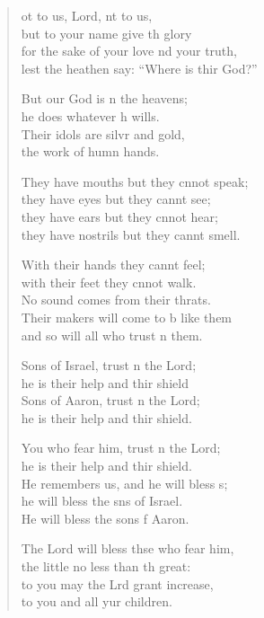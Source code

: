 \settowidth{\versewidth}{for the sake of your love and your truth, *}
\begin{verse}%
  \begin{patverse}
ot to us, Lord, nt to us,\Med\\
but to your name give th glory\\
for the sake of your love nd your truth,\Med\\
lest the heathen say: “Where is thir God?”

But our God is \pointup{\i}n the heavens;\Med\\
he does whatever h wills.\\
Their idols are silvr and gold,\Med\\
the work of humn hands.

They have mouths but they cnnot speak;\Med\\
they have eyes but they cannt see;\\
they have ears but they cnnot hear;\Med\\
they have nostrils but they cannt smell.

With their hands they cannt feel;\Flex\\
with their feet they cnnot walk.\Med\\
No sound comes from their thrats.\\
Their makers will come to b like them\Med\\
and so will all who trust \pointup{\i}n them.

Sons of Israel, trust \pointup{\i}n the Lord;\Med\\
he is their help and thir shield\\
Sons of Aaron, trust \pointup{\i}n the Lord;\Med\\
he is their help and thir shield.

You who fear him, trust \pointup{\i}n the Lord;\Med\\
he is their help and thir shield.\\
He remembers us, and he will bless s;\Flex\\
he will bless the sns of Israel.\Med\\
He will bless the sons f Aaron.

The Lord will bless thse who fear him,\Med\\
the little no less than th great:\\
to you may the Lrd grant increase,\Med\\
to you and all yur children.


\end{patverse}
\end{verse}
